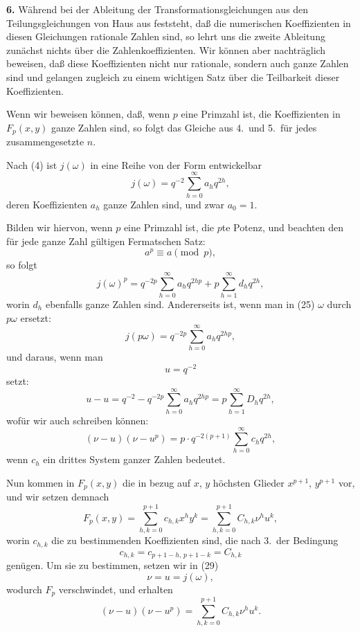 \documentclass[12pt,a4paper]{article}
\theoremstyle{definition}
\begin{document}
\textbf{6.} Während bei der Ableitung der Transformationsgleichungen aus den Teilungsgleichungen von Haus aus feststeht, daß die numerischen Koeffizienten in diesen Gleichungen rationale Zahlen sind, so lehrt uns die zweite Ableitung zunächst nichts über die Zahlenkoeffizienten. Wir können aber nachträglich beweisen, daß diese Koeffizienten nicht nur rationale, sondern auch ganze Zahlen sind und gelangen zugleich zu einem wichtigen Satz über die Teilbarkeit dieser Koeffizienten.

Wenn wir beweisen können, daß, wenn $p$ eine Primzahl ist, die Koeffizienten in $F_p(x, y)$ ganze Zahlen sind, so folgt das Gleiche aus 4.\ und 5.\ für jedes zusammengesetzte $n$.

Nach (4) ist $j(\omega)$ in eine Reihe von der Form entwickelbar
\begin{equation}\label{eq:69-25}
j(\omega) = q^{-2} \sum_{h=0}^{\infty} a_h q^{2h},
\end{equation}
deren Koeffizienten $a_h$ ganze Zahlen sind, und zwar $a_0 = 1$.

Bilden wir hiervon, wenn $p$ eine Primzahl ist, die $p$te Potenz, und beachten den für jede ganze Zahl gültigen Fermatschen Satz:
\[
a^p \equiv a \pmod{p},
\]
so folgt
\begin{equation}\label{eq:69-26}
j(\omega)^p = q^{-2p} \sum_{h=0}^{\infty} a_h q^{2hp} + p \sum_{h=1}^{\infty} d_h q^{2h},
\end{equation}
worin $d_h$ ebenfalls ganze Zahlen sind. Andererseits ist, wenn man in (25) $\omega$ durch $p\omega$ ersetzt:
\begin{equation}\label{eq:69-27}
j(p\omega) = q^{-2p} \sum_{h=0}^{\infty} a_h q^{2hp},
\end{equation}
und daraus, wenn man
\[
u = q^{-2}
\]
setzt:
\[
u - u = q^{-2} - q^{-2p} \sum_{h=0}^{\infty} a_h q^{2hp} = p \sum_{h=1}^{\infty} D_h q^{2h},
\]
wofür wir auch schreiben können:
\begin{equation}\label{eq:69-28}
(\nu - u)(\nu - u^p) = p \cdot q^{-2(p+1)} \sum_{h=0}^{\infty} c_h q^{2h},
\end{equation}
wenn $c_h$ ein drittes System ganzer Zahlen bedeutet.

Nun kommen in $F_p(x, y)$ die in bezug auf $x$, $y$ höchsten Glieder $x^{p+1}$, $y^{p+1}$ vor, und wir setzen demnach
\begin{equation}\label{eq:69-29}
F_p(x, y) = \sum_{h,k=0}^{p+1} c_{h,k} x^h y^k = \sum_{h,k=0}^{p+1} C_{h,k} \nu^h u^k,
\end{equation}
worin $c_{h,k}$ die zu bestimmenden Koeffizienten sind, die nach 3.\ der Bedingung
\[
c_{h,k} = c_{p+1-h,\,p+1-k} = C_{h,k}
\]
genügen. Um sie zu bestimmen, setzen wir in (29)
\[
\nu = u = j(\omega),
\]
wodurch $F_p$ verschwindet, und erhalten
\begin{equation}\label{eq:69-30}
(\nu - u)(\nu - u^p) = \sum_{h,k=0}^{p+1} C_{h,k} \nu^h u^k.
\end{equation}
\end{document}
